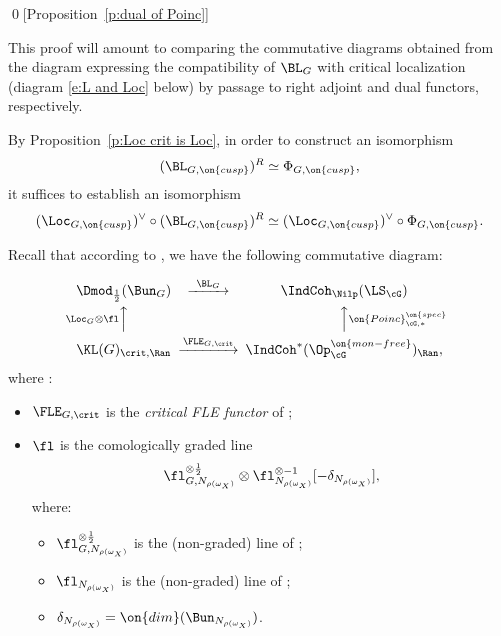 \documentclass[9pt]{amsart}
\theoremstyle{remark}
\theoremstyle{definition}
\theoremstyle{remark}
\newcommand{\thmref}[1]{Theorem~\ref{#1}}
\newcommand{\propref}[1]{Proposition~\ref{#1}}
\numberwithin{equation}{section}
\begin{document}
\qed[\propref{p:dual of Poinc}]

\ssec{Proof of \thmref{t:right adj as dual}} 

This proof will amount to comparing the commutative diagrams obtained from the diagram expressing
the compatibility of $\BL_G$ with critical localization (diagram \eqref{e:L and Loc} below) 
by passage to right adjoint and dual functors, respectively. 

\sssec{}

By \propref{p:Loc crit is Loc}, in order to construct an isomorphism 
$$(\BL_{G,\on{cusp}})^R \simeq  \Phi_{G,\on{cusp}},$$
it suffices to establish an isomorphism 
\begin{equation} \label{e:right adjoints an coloc}
(\Loc_{G,\on{cusp}})^\vee \circ (\BL_{G,\on{cusp}})^R \simeq (\Loc_{G,\on{cusp}})^\vee \circ \Phi_{G,\on{cusp}}.
\end{equation} 

\sssec{} \label{sss:L and Loc}

Recall that according to \cite[Theorem 18.5.2]{GLC2}, we have the following commutative diagram:

\begin{equation} \label{e:L and Loc}
\CD
\Dmod_{\frac{1}{2}}(\Bun_G) @>{\BL_G}>> \IndCoh_\Nilp(\LS_\cG) \\
@A{\Loc_G\otimes \fl}AA @AA{\on{Poinc}^{\on{spec}}_{\cG,*}}A \\
\KL(G)_{\crit,\Ran} @>{\FLE_{G,\crit}}>> \IndCoh^*(\Op^{\on{mon-free}}_\cG)_\Ran,
\endCD
\end{equation}
where :

\begin{itemize}

\item $\FLE_{G,\crit}$ is the \emph{critical FLE functor} of \cite[Equation (6.7)]{GLC2};

\item $\fl$ is the comologically graded line $$\fl^{\otimes \frac{1}{2}}_{G,N_{\rho(\omega_X)}}\otimes 
\fl^{\otimes -1}_{N_{\rho(\omega_X)}}[-\delta_{N_{\rho(\omega_X)}}],$$
where:

\begin{itemize}

\item $\fl^{\otimes \frac{1}{2}}_{G,N_{\rho(\omega_X)}}$ is the (non-graded) line of \cite[Equation (9.7)]{GLC2};

\item $\fl_{N_{\rho(\omega_X)}}$ is the (non-graded) line of \cite[Equation (14.2)]{GLC2};

\item $\delta_{N_{\rho(\omega_X)}}=\on{dim}(\Bun_{N_{\rho(\omega_X)}})$. 

\end{itemize}

\end{itemize}
\end{document}
